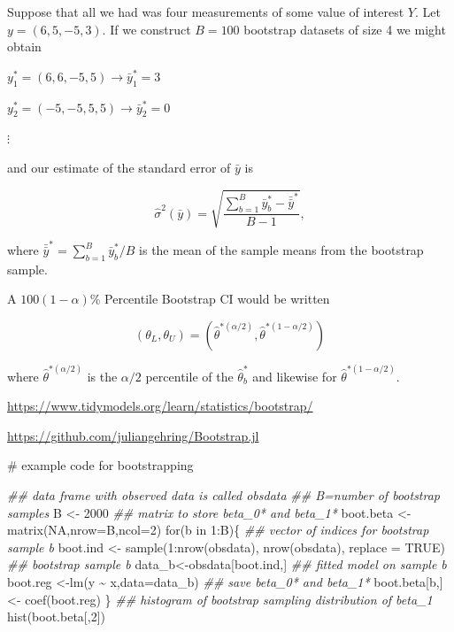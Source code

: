 \documentclass[
  letterpaper,
  DIV=11,
  numbers=noendperiod]{scrreport}
\newenvironment{Shaded}{\begin{snugshade}}{\end{snugshade}}
\newcommand{\AttributeTok}[1]{\textcolor[rgb]{0.40,0.45,0.13}{#1}}
\newcommand{\CommentTok}[1]{\textcolor[rgb]{0.37,0.37,0.37}{#1}}
\newcommand{\ConstantTok}[1]{\textcolor[rgb]{0.56,0.35,0.01}{#1}}
\newcommand{\ControlFlowTok}[1]{\textcolor[rgb]{0.00,0.23,0.31}{#1}}
\newcommand{\DecValTok}[1]{\textcolor[rgb]{0.68,0.00,0.00}{#1}}
\newcommand{\DocumentationTok}[1]{\textcolor[rgb]{0.37,0.37,0.37}{\textit{#1}}}
\newcommand{\FunctionTok}[1]{\textcolor[rgb]{0.28,0.35,0.67}{#1}}
\newcommand{\NormalTok}[1]{\textcolor[rgb]{0.00,0.23,0.31}{#1}}
\newcommand{\OtherTok}[1]{\textcolor[rgb]{0.00,0.23,0.31}{#1}}
\newcommand{\SpecialCharTok}[1]{\textcolor[rgb]{0.37,0.37,0.37}{#1}}
\begin{document}
Suppose that all we had was four measurements of some value of interest
\(Y\). Let \(y = (6,5,-5,3)\). If we construct \(B=100\) bootstrap
datasets of size 4 we might obtain

\(y_1^* = (6,6,-5,5) \to \bar y_1^* = 3\)

\(y_2^* = (-5,-5,5,5) \to \bar y_2^* = 0\)

\(\vdots\)

and our estimate of the standard error of \(\bar y\) is

\[
\hat\sigma^2(\bar y) = \sqrt{\frac{\sum_{b=1}^B \bar y_b^* - \bar{\bar y}^*}{B-1}},
\]

where \(\bar{\bar y}^* = \sum_{b=1}^B \bar y_b^* / B\) is the mean of
the sample means from the bootstrap sample.

A \(100(1-\alpha)\)\% Percentile Bootstrap CI would be written

\[
(\theta_L, \theta_U) = \left( \hat \theta^{*(\alpha/2)}, \hat \theta^{*(1-\alpha/2)}\right)
\]

where \(\hat \theta^{*(\alpha/2)}\) is the \(\alpha / 2\) percentile of
the \(\hat \theta_b^*\) and likewise for
\(\hat \theta^{*(1-\alpha/2)}\).

\url{https://www.tidymodels.org/learn/statistics/bootstrap/}

\url{https://github.com/juliangehring/Bootstrap.jl}

\begin{Shaded}
\begin{Highlighting}[]
\CommentTok{\# example code for bootstrapping}

\DocumentationTok{\#\# data frame with observed data is called obsdata}
\DocumentationTok{\#\# B=number of bootstrap samples}
\NormalTok{B }\OtherTok{\textless{}{-}} \DecValTok{2000}
\DocumentationTok{\#\# matrix to store beta\_0* and beta\_1*}
\NormalTok{boot.beta }\OtherTok{\textless{}{-}} \FunctionTok{matrix}\NormalTok{(}\ConstantTok{NA}\NormalTok{,}\AttributeTok{nrow=}\NormalTok{B,}\AttributeTok{ncol=}\DecValTok{2}\NormalTok{)}
\ControlFlowTok{for}\NormalTok{(b }\ControlFlowTok{in} \DecValTok{1}\SpecialCharTok{:}\NormalTok{B)\{}
\DocumentationTok{\#\# vector of indices for bootstrap sample b}
\NormalTok{boot.ind }\OtherTok{\textless{}{-}} \FunctionTok{sample}\NormalTok{(}\DecValTok{1}\SpecialCharTok{:}\FunctionTok{nrow}\NormalTok{(obsdata), }\FunctionTok{nrow}\NormalTok{(obsdata), }\AttributeTok{replace =} \ConstantTok{TRUE}\NormalTok{)}
\DocumentationTok{\#\# bootstrap sample b}
\NormalTok{data\_b}\OtherTok{\textless{}{-}}\NormalTok{obsdata[boot.ind,]}
\DocumentationTok{\#\# fitted model on sample b}
\NormalTok{boot.reg }\OtherTok{\textless{}{-}}\FunctionTok{lm}\NormalTok{(y }\SpecialCharTok{\textasciitilde{}}\NormalTok{ x,}\AttributeTok{data=}\NormalTok{data\_b)}
\DocumentationTok{\#\# save beta\_0* and beta\_1*}
\NormalTok{boot.beta[b,] }\OtherTok{\textless{}{-}} \FunctionTok{coef}\NormalTok{(boot.reg)}
\NormalTok{\}}
\DocumentationTok{\#\# histogram of bootstrap sampling distribution of beta\_1}
\FunctionTok{hist}\NormalTok{(boot.beta[,}\DecValTok{2}\NormalTok{])}
\end{Highlighting}
\end{Shaded}
\end{document}
